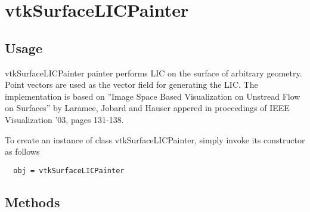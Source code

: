 \section{vtkSurfaceLICPainter}

\subsection{Usage}

  vtkSurfaceLICPainter painter performs LIC on the surface of arbitrary
  geometry. Point vectors are used as the vector field for generating the LIC.
  The implementation is based on ''Image Space Based Visualization on Unstread
  Flow on Surfaces'' by Laramee, Jobard and Hauser appered in proceedings of 
  IEEE Visualization '03, pages 131-138.
  

To create an instance of class vtkSurfaceLICPainter, simply
invoke its constructor as follows
\begin{verbatim}
  obj = vtkSurfaceLICPainter
\end{verbatim}
\subsection{Methods}

